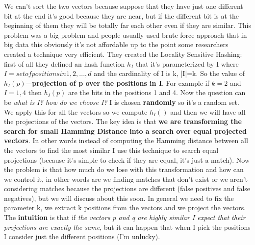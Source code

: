 We can't sort the two vectors because suppose that they have just one different bit at the end it's good because they are near, but if the different bit is at the beginning of them they will be totally far each other even if they are similar. This problem was a big problem and people usually used brute force approach that in big data this obviously it's not affordable up to the point some researchers created a technique very efficient.\newline
They created the Locality Sensitive Hashing: first of all they defined an hash function $h_I$ that it's parameterized by I where $I = set of positions in {1,2,...,d}$ and the cardinality of I is k, |I|=k. So the value of \textbf{$h_I(p)$=projection of p over the positions in I}.\newline
For example if $k=2$ and $I={1,4}$ then $h_I(p)$ are the bits in the positions 1 and 4. Now the question can be \textit{what is I? how do we choose I?} I is chosen \textbf{randomly} so it's a random set.\newline
We apply this for all the vectors so we compute $h_I()$ and then we will have all the projections of the vectors. The key idea is that \textbf{we are transforming the search for small Hamming Distance into a search over equal projected vectors}. In other words instead of computing the Hamming distance between all the vectors to find the most similar I use this technique to search equal projections (because it's simple to check if they are equal, it's just a match).\newline
Now the problem is that how much do we lose with this transformation and how can we control it, in other words are we finding matches that don't exist or we aren't considering matches because the projections are different (false positives and false negatives), but we will discuss about this soon. In general we need to fix the parameter k, we extract k positions from the vectors and we project the vectors. The \textbf{intuition} is that if \textit{the vectors p and q are highly similar I expect that their projections are exactly the same}, but it can happen that when I pick the positions I consider just the different positions (I'm unlucky).\newline
